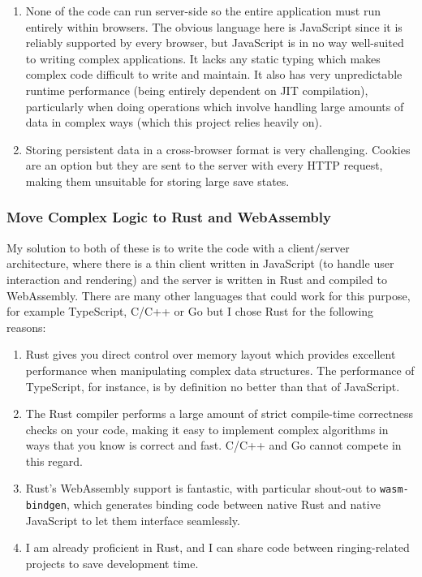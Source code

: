 \documentclass[12pt]{article}
\begin{document}
\begin{enumerate}
    \item None of the code can run server-side so the entire application must run entirely within
        browsers.  The obvious language here is JavaScript since it is reliably supported by every
        browser, but JavaScript is in no way well-suited to writing complex applications.  It lacks
        any static typing which makes complex code difficult to write and maintain.  It also has
        very unpredictable runtime performance (being entirely dependent on JIT compilation),
        particularly when doing operations which involve handling large amounts of data in complex
        ways (which this project relies heavily on).
    \item Storing persistent data in a cross-browser format is very challenging.  Cookies are an
        option but they are sent to the server with every HTTP request, making them unsuitable for
        storing large save states.
\end{enumerate}

\subsubsection{Move Complex Logic to Rust and WebAssembly}

My solution to both of these is to write the code with a client/server architecture, where there is
a thin client written in JavaScript (to handle user interaction and rendering) and the server is
written in Rust and compiled to WebAssembly.  There are many other languages that could work for
this purpose, for example TypeScript, C/C++ or Go but I chose Rust for the following reasons:

\begin{enumerate}
    \item Rust gives you direct control over memory layout which provides excellent performance when
        manipulating complex data structures.  The performance of TypeScript, for instance, is by
        definition no better than that of JavaScript.
    \item The Rust compiler performs a large amount of strict compile-time correctness checks on
        your code, making it easy to implement complex algorithms in ways that you know is correct
        and fast.  C/C++ and Go cannot compete in this regard.
    \item Rust's WebAssembly support is fantastic, with particular shout-out to \verb|wasm-bindgen|,
        which generates binding code between native Rust and native JavaScript to let them interface
        seamlessly.
    \item I am already proficient in Rust, and I can share code between ringing-related projects to
        save development time.
\end{enumerate}
\end{document}
